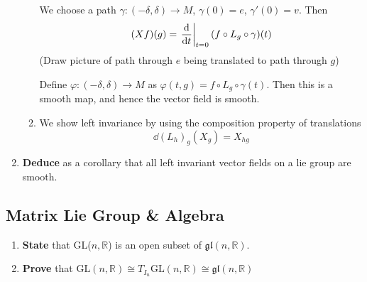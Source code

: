 \documentclass[prb,12pt]{revtex4-2}
\theoremstyle{definition}
\theoremstyle{definition}
\newcommand{\R}{\mathbb{R}}
\begin{document}
\begin{enumerate}[resume]
\begin{enumerate}[label=(\alph*)]
		We choose a path $\gamma:(-\delta, \delta)\to M$, $\gamma(0)=e$,  $\gamma'(0)=v$. Then
		\[(Xf)(g) = \left.\dv{t}\right|_{t=0}(f\circ L_g\circ \gamma)(t)\]
		(Draw picture of path through $e$ being translated to path through $g$)
		
		Define $\varphi:(-\delta, \delta)\to M$ as $\varphi(t,g)=f\circ L_g \circ \gamma(t)$. Then this is a smooth map, and hence the vector field is smooth.
		\item We show left invariance by using the composition property of translations
		\[\dd{(L_h)_g}(X_g)=X_{hg}\]
	\end{enumerate}
	\item \textbf{Deduce} as a corollary that all left invariant vector fields on a lie group are smooth.
\end{enumerate}
\subsection{Matrix Lie Group \& Algebra}
\begin{enumerate}[resume]
	\item \textbf{State} that GL($n, \R$) is an open subset of $\mathfrak{gl}(n, \R)$.
	\item \textbf{Prove} that $\text{GL}(n, \R)\cong T_{I_n}\text{GL}(n, \R)\cong \mathfrak{gl}(n, \R)$
\end{enumerate}
\end{document}

